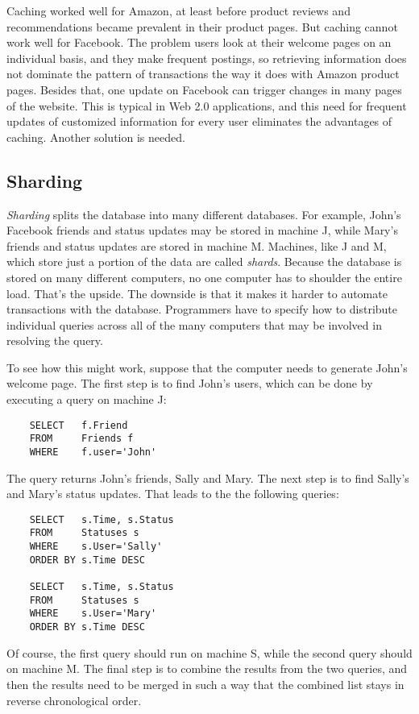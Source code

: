 Caching worked well for Amazon, at least before product reviews and recommendations became prevalent
in their product pages.  
But caching cannot work well for Facebook.  The problem users look at their
welcome pages on an individual basis, and they make frequent postings, so retrieving information
does not dominate the pattern of transactions the way it does with Amazon product pages.
Besides that, one update on Facebook can trigger changes in many pages of the website.
This is typical in Web 2.0 applications, and this need for frequent updates of customized information for every user eliminates the advantages of caching. Another solution is needed.

\subsection{Sharding}

\emph{Sharding} splits the database into many different databases.
For example, John's Facebook friends and status updates may be stored in machine J, while
Mary's friends and status updates are stored in machine M.  
Machines, like J and M, which store just a portion of the data are called \emph{shards}. 
Because the database is stored on many different computers, 
no one computer has to shoulder the entire load. 
That's the upside. 
The downside is that it makes it harder to automate transactions with the database.
Programmers have to specify how to distribute individual queries across all of the many computers
that may be involved in resolving the query.

To see how this might work, 
suppose that the computer needs to generate John's welcome page.  
The first step is to find John's users, which can be done by executing a query on machine J:
\begin{verbatim}
	SELECT   f.Friend
	FROM     Friends f
	WHERE    f.user='John'
\end{verbatim}
The query returns John's friends, Sally and Mary.  
The next step is to find Sally's and Mary's status updates.
That leads to the the following queries:
\begin{verbatim}
	SELECT   s.Time, s.Status
	FROM     Statuses s
	WHERE    s.User='Sally'
	ORDER BY s.Time DESC

	SELECT   s.Time, s.Status
	FROM     Statuses s
	WHERE    s.User='Mary'
	ORDER BY s.Time DESC
\end{verbatim}
Of course, the first query should run on machine S, 
while the second query should on machine M.  
The final step is to combine the results from the two queries,
and then the results need to be merged in such a way
that the combined list stays in reverse chronological order.

